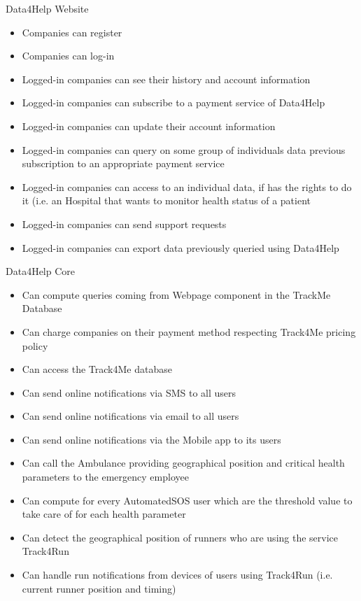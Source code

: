 \noindent Data4Help Website
\begin{itemize}
    \item Companies can register
    \item Companies can log-in
    \item Logged-in companies can see their history and account information
    \item Logged-in companies can subscribe to a payment service of Data4Help
    \item Logged-in companies can update their account information
    \item Logged-in companies can query on some group of individuals data
    previous subscription to an appropriate payment service 
    \item Logged-in companies can access to an individual data, if has the rights to do it (i.e. an Hospital that wants to monitor health status of a patient
    \item Logged-in companies can send support requests
    \item Logged-in companies can export data previously queried using Data4Help
\end{itemize}

\noindent Data4Help Core
\begin{itemize}
\item Can compute queries coming from Webpage component in the TrackMe Database
\item Can charge companies on their payment method respecting Track4Me pricing policy
\item Can access the Track4Me database
\item Can send online notifications  via SMS to all users 
\item Can send online notifications via email to all users
\item Can send online notifications via the Mobile app to its users

\item Can call the Ambulance providing geographical position and critical health parameters to the emergency employee 
\item Can compute for every AutomatedSOS user which are the threshold value to take care of for each health parameter

\item Can detect the geographical position of runners who are using the service Track4Run
\item Can handle run notifications from devices of users using Track4Run (i.e. current runner position and timing)
\end{itemize}
